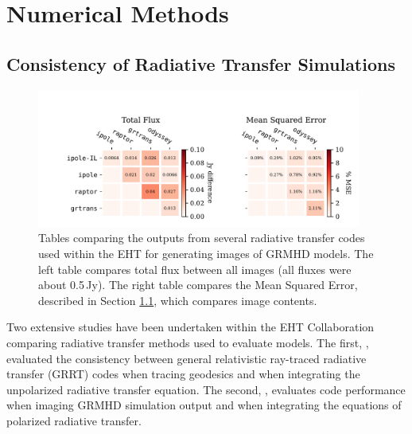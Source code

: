 \section{Numerical Methods}\label{app:numerical}


\subsection{Consistency of Radiative Transfer Simulations}\label{app:radtrans}

\begin{figure}
  \centering
  \includegraphics[width=0.95\textwidth]{figures/grmhd_hi_IntegratedUnpolarizeds_plot.pdf}
  \caption{Tables comparing the outputs from several radiative transfer codes used within the EHT for generating images of GRMHD models.  The left table compares total flux between all images (all fluxes were about 0.5\,Jy). The right table compares the Mean Squared Error, described in Section \ref{app:radtrans}, which compares image contents.}
  \label{fig:radtrans_grmhd_comp}
\end{figure}

Two extensive studies have been undertaken within the EHT Collaboration comparing radiative transfer methods used to evaluate models.  The first, \citep{2020ApJ...897..148G}, evaluated the consistency between general relativistic ray-traced radiative transfer (GRRT) codes when tracing geodesics and when integrating the unpolarized radiative transfer equation.  The second, \citet{Prather_et_al_2022}, evaluates code performance when imaging GRMHD simulation output and when integrating the equations of polarized radiative transfer.

